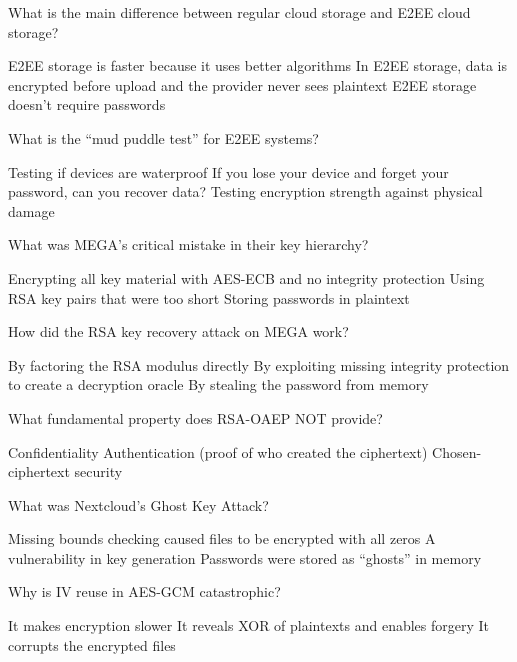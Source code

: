 \documentclass[10pt,a4paper,american]{exam}
\begin{document}
\begin{questions}
	\question What is the main difference between regular cloud storage and E2EE cloud storage?
	\begin{randomizechoices}
		\choice E2EE storage is faster because it uses better algorithms
		\CorrectChoice In E2EE storage, data is encrypted before upload and the provider never sees plaintext
		\choice E2EE storage doesn't require passwords
	\end{randomizechoices}

	\question What is the ``mud puddle test'' for E2EE systems?
	\begin{randomizechoices}
		\choice Testing if devices are waterproof
		\CorrectChoice If you lose your device and forget your password, can you recover data?
		\choice Testing encryption strength against physical damage
	\end{randomizechoices}

	\question What was MEGA's critical mistake in their key hierarchy?
	\begin{randomizechoices}
		\CorrectChoice Encrypting all key material with AES-ECB and no integrity protection
		\choice Using RSA key pairs that were too short
		\choice Storing passwords in plaintext
	\end{randomizechoices}

	\question How did the RSA key recovery attack on MEGA work?
	\begin{randomizechoices}
		\choice By factoring the RSA modulus directly
		\CorrectChoice By exploiting missing integrity protection to create a decryption oracle
		\choice By stealing the password from memory
	\end{randomizechoices}

	\question What fundamental property does RSA-OAEP NOT provide?
	\begin{randomizechoices}
		\choice Confidentiality
		\CorrectChoice Authentication (proof of who created the ciphertext)
		\choice Chosen-ciphertext security
	\end{randomizechoices}

	\question What was Nextcloud's Ghost Key Attack?
	\begin{randomizechoices}
		\CorrectChoice Missing bounds checking caused files to be encrypted with all zeros
		\choice A vulnerability in key generation
		\choice Passwords were stored as ``ghosts'' in memory
	\end{randomizechoices}

	\question Why is IV reuse in AES-GCM catastrophic?
	\begin{randomizechoices}
		\choice It makes encryption slower
		\CorrectChoice It reveals XOR of plaintexts and enables forgery
		\choice It corrupts the encrypted files
	\end{randomizechoices}


\end{questions}
\end{document}
